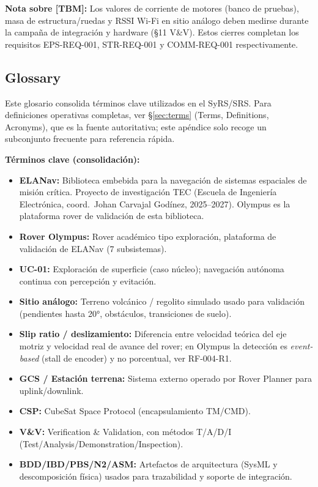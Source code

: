 \textbf{Nota sobre [TBM]:} Los valores de corriente de motores (banco de pruebas), masa de estructura/ruedas y RSSI Wi-Fi en sitio análogo deben medirse durante la campaña de integración y hardware (§11 V\&V). Estos cierres completan los requisitos EPS-REQ-001, STR-REQ-001 y COMM-REQ-001 respectivamente.

\subsection{Glossary}

Este glosario consolida términos clave utilizados en el SyRS/SRS. Para definiciones operativas completas, ver \S\ref{sec:terms} (Terms, Definitions, Acronyms), que es la fuente autoritativa; este apéndice solo recoge un subconjunto frecuente para referencia rápida.

\textbf{Términos clave (consolidación):}
\begin{itemize}
    \item \textbf{ELANav:} Biblioteca embebida para la navegación de sistemas espaciales de misión crítica. Proyecto de investigación TEC (Escuela de Ingeniería Electrónica, coord.\ Johan Carvajal Godínez, 2025--2027). Olympus es la plataforma rover de validación de esta biblioteca.
    \item \textbf{Rover Olympus:} Rover académico tipo exploración, plataforma de validación de ELANav (7 subsistemas).
    \item \textbf{UC-01:} Exploración de superficie (caso núcleo); navegación autónoma continua con percepción y evitación.
    \item \textbf{Sitio análogo:} Terreno volcánico / regolito simulado usado para validación (pendientes hasta 20°, obstáculos, transiciones de suelo).
    \item \textbf{Slip ratio / deslizamiento:} Diferencia entre velocidad teórica del eje motriz y velocidad real de avance del rover; en Olympus la detección es \emph{event-based} (stall de encoder) y no porcentual, ver RF-004-R1.
    \item \textbf{GCS / Estación terrena:} Sistema externo operado por Rover Planner para uplink/downlink.
    \item \textbf{CSP:} CubeSat Space Protocol (encapsulamiento TM/CMD).
    \item \textbf{V\&V:} Verification \& Validation, con métodos T/A/D/I (Test/Analysis/Demonstration/Inspection).
    \item \textbf{BDD/IBD/PBS/N2/ASM:} Artefactos de arquitectura (SysML y descomposición física) usados para trazabilidad y soporte de integración.
\end{itemize}

